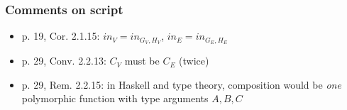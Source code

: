 \documentclass[handout]{beamer}
\begin{document}
\frame
  {   
    \frametitle{Comments on script}\label{Ch1:comments}

 \begin{itemize}[<+->]
\item p. 19, Cor. 2.1.15: $in_V = in_{G_V,H_V}$, $in_E = in_{G_E,H_E}$
\item p. 29, Conv. 2.2.13: $C_V$ must be $C_E$ (twice)
\item p. 29, Rem. 2.2.15: in Haskell and type theory, composition would be
\emph{one} polymorphic function with type arguments $A,B,C$
 \end{itemize}

 }
\end{document}

